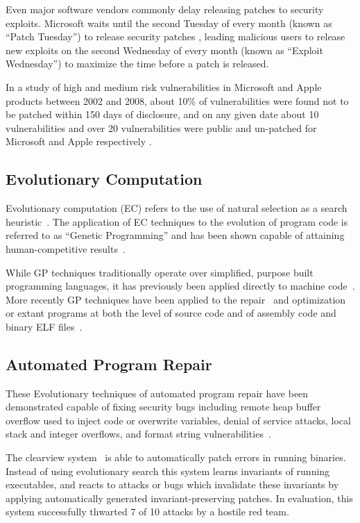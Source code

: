 \documentclass{sigcomm-alternate}
\begin{document}
Even major software vendors commonly delay releasing patches to
security exploits.  Microsoft waits until the second Tuesday of every
month (known as ``Patch Tuesday'') to release security patches
\cite{lemos2003microsoft}, leading malicious users to release new
exploits on the second Wednesday of every month (known as ``Exploit
Wednesday'') to maximize the time before a patch is released.

In a study of high and medium risk vulnerabilities in Microsoft and
Apple products between 2002 and 2008, about 10\% of
vulnerabilities were found not to be patched within 150 days of
disclosure, and on any given date about 10 vulnerabilities and over 20
vulnerabilities were public and un-patched for Microsoft and Apple
respectively \cite{frei20080}.

\subsection{Evolutionary Computation}
Evolutionary computation (EC) refers to the use of natural selection
as a search heuristic~\cite{holland1992adaptation,koza1992genetic}.
The application of EC techniques to the evolution of program code is
referred to as ``Genetic Programming'' \cite{poli2008field} and has
been shown capable of attaining human-competitive
results~\cite{koza2000automatic}.

While GP techniques traditionally operate over simplified, purpose
built programming languages, it has previously been applied directly
to machine code~\cite{kuhling2002brute}.  More recently GP techniques
have been applied to the repair~\cite{weimer2009automatically} and
optimization~\cite{sitthi2011genetic,schulte2013optimization} or
extant programs at both the level of source code and of assembly code
and binary ELF files~\cite{schulte2013embedded}.

\subsection{Automated Program Repair}
These Evolutionary techniques of automated program repair have been
demonstrated capable of fixing security bugs including remote heap
buffer overflow used to inject code or overwrite variables, denial of
service attacks, local stack and integer overflows, and format string
vulnerabilities~\cite{genprog-tse-journal}.

The clearview system~\cite{clearview} is able to automatically patch
errors in running binaries.  Instead of using evolutionary search this
system learns invariants of running executables, and reacts to attacks
or bugs which invalidate these invariants by applying automatically
generated invariant-preserving patches.  In evaluation, this system
successfully thwarted 7 of 10 attacks by a hostile red team.
\end{document}

